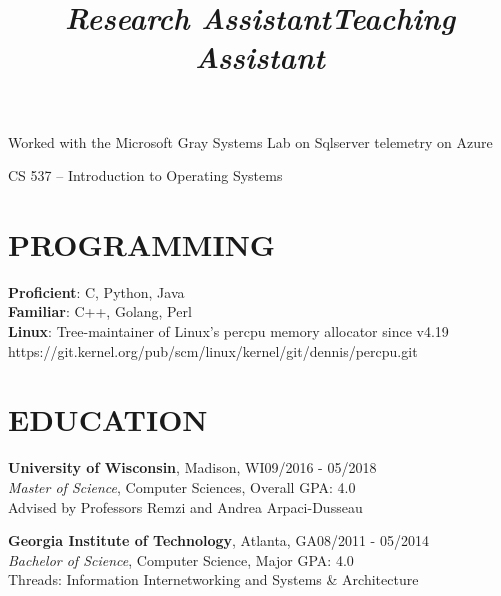 \documentclass[margin,11pt]{res}
\begin{document}
\begin{resume}
\title{\sl{Research Assistant}}
\begin{position}
Worked with the Microsoft Gray Systems Lab on Sqlserver telemetry on Azure
\end{position}

\vspace{-24pt}
\employer{}
\location{}
\title{\sl{Teaching Assistant}}
\begin{position}
CS 537 – Introduction to Operating Systems
\end{position}


\section{PROGRAMMING}

\textbf{Proficient}: C, Python, Java\\
\textbf{Familiar}: C++, Golang, Perl\\
\textbf{Linux}: Tree-maintainer of Linux's percpu memory allocator since v4.19\\
https://git.kernel.org/pub/scm/linux/kernel/git/dennis/percpu.git

\section{EDUCATION}
\textbf{University of Wisconsin}, Madison, WI\hfill 09/2016 - 05/2018\\
{\sl Master of Science}, Computer Sciences, Overall GPA: 4.0\\
Advised by Professors Remzi and Andrea Arpaci-Dusseau

\vspace{-10pt}
\textbf{Georgia Institute of Technology}, Atlanta, GA\hfill 08/2011 - 05/2014\\
{\sl Bachelor of Science}, Computer Science, Major GPA: 4.0\\
Threads: Information Internetworking and Systems \& Architecture


\end{resume}
\end{document}
